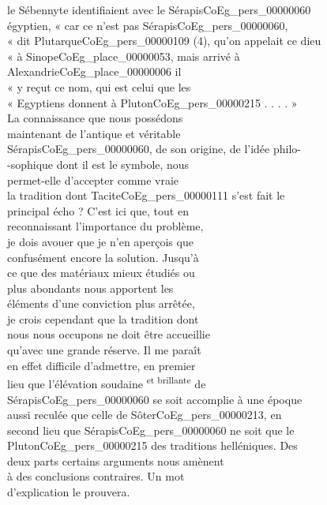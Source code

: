 \documentclass{book}
\begin{document}
{\begin{paracol}{2}
le Sébennyte identifiaient avec le Sérapis\gls{CoEg_pers_00000060}\\
égyptien, « car ce n’est pas Sérapis\gls{CoEg_pers_00000060},\\
« dit Plutarque\gls{CoEg_pers_00000109} (4), qu’on appelait ce dieu\\
« à Sinope\gls{CoEg_place_00000053}, mais arrivé à Alexandrie\gls{CoEg_place_00000006} il\\
« y reçut ce nom, qui est celui que les\\
« Egyptiens donnent à Pluton\gls{CoEg_pers_00000215} . . . . »\\
\indent La connaissance que nous possédons\\
maintenant de l’antique et véritable\\
Sérapis\gls{CoEg_pers_00000060}, de son origine, de l’idée philo-\\
-sophique dont il est le symbole, nous\\
permet-elle d’accepter comme vraie\\
la tradition dont Tacite\gls{CoEg_pers_00000111} s’est fait le\\
principal écho ? C’est ici que, tout en\\
reconnaissant l’importance du problème,\\
je dois avouer que je n’en aperçois que\\
confusément encore la solution. Jusqu’à\\
ce que des matériaux mieux étudiés ou\\
plus abondants nous apportent les\\
éléments d’une conviction plus arrêtée,\\
je crois cependant que la tradition dont\\
nous nous occupons ne doit être accueillie\\
qu’avec une grande réserve. Il me paraît\\
en effet difficile d’admettre, en premier\\
lieu que l’élévation soudaine \textsuperscript{et brillante} de\\
Sérapis\gls{CoEg_pers_00000060} se soit accomplie à une époque\\
aussi reculée que celle de Sôter\gls{CoEg_pers_00000213}, en\\
second lieu que Sérapis\gls{CoEg_pers_00000060} ne soit que le\\
Pluton\gls{CoEg_pers_00000215} des traditions helléniques. Des\\
deux parts certains arguments nous amènent\\
à des conclusions contraires. Un mot\\
d’explication le prouvera.
\end{paracol}

}
\end{document}
